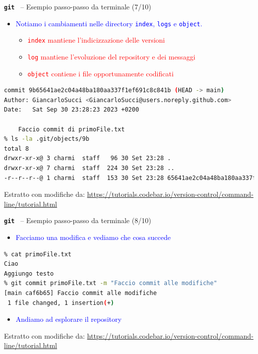 \documentclass{beamer}
\newcommand{\git}{\texttt{\textbf{git}}\xspace}
\begin{document}
\begin{frame}[fragile]{\centerline{\git ~ -- Esempio passo-passo da terminale (7/10)}}
\begin{itemize}
\item \textcolor{blue}{Notiamo i cambiamenti nelle directory \texttt{index}, \texttt{logs} e \texttt{object}.}
\begin{itemize}
\item \textcolor{red}{\texttt{index} mantiene l'indicizzazione delle versioni }
\item \textcolor{red}{\texttt{log} mantiene l'evoluzione del repository e dei messaggi}
\item \textcolor{red}{\texttt{object} contiene i file opportunamente codificati }

\end{itemize}

\end{itemize}
\begin{lstlisting}[language=sh]
 % git log
commit 9b65641ae2c04a48ba180aa337f1ef691c8c841b (HEAD -> main)
Author: GiancarloSucci <GiancarloSucci@users.noreply.github.com>
Date:   Sat Sep 30 23:28:23 2023 +0200

    Faccio commit di primoFile.txt
% ls -la .git/objects/9b 
total 8
drwxr-xr-x@ 3 charmi  staff   96 30 Set 23:28 .
drwxr-xr-x@ 7 charmi  staff  224 30 Set 23:28 ..
-r--r--r--@ 1 charmi  staff  153 30 Set 23:28 65641ae2c04a48ba180aa337f1ef691c8c841b

\end{lstlisting}

\begin{center}
    \tiny Estratto con modifiche da: \url{https://tutorials.codebar.io/version-control/command-line/tutorial.html}
\end{center}
\end{frame}

\begin{frame}[fragile]{\centerline{\git ~ -- Esempio passo-passo da terminale (8/10)}}
\begin{itemize}
\item \textcolor{blue}{Facciamo una modifica e vediamo che cosa succede}

\end{itemize}
\begin{lstlisting}[language=sh]
% echo "Aggiungo testo " >> primoFile.txt
% cat primoFile.txt 
Ciao
Aggiungo testo 
% git commit primoFile.txt -m "Faccio commit alle modifiche"
[main caf6b65] Faccio commit alle modifiche
 1 file changed, 1 insertion(+)

\end{lstlisting}
\begin{itemize}
\item \textcolor{blue}{Andiamo ad esplorare il repository}

\end{itemize}

\begin{center}
    \tiny Estratto con modifiche da: \url{https://tutorials.codebar.io/version-control/command-line/tutorial.html}
\end{center}
\end{frame}
\end{document}
